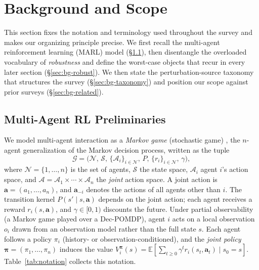 \section{Background and Scope}
\label{sec:background}

This section fixes the notation and terminology used throughout the survey and
makes our organizing principle precise. We first recall the multi-agent
reinforcement learning (MARL) model (\S\ref{sec:bg-marl}), then disentangle the
overloaded vocabulary of \emph{robustness} and define the worst-case objects that
recur in every later section (\S\ref{sec:bg-robust}). We then state the
perturbation-source taxonomy that structures the survey (\S\ref{sec:bg-taxonomy})
and position our scope against prior surveys (\S\ref{sec:bg-related}).

\subsection{Multi-Agent RL Preliminaries}
\label{sec:bg-marl}

We model multi-agent interaction as a \emph{Markov game} (stochastic game)
\cite{littman1994markov}, the $n$-agent generalization of the Markov decision
process, written as the tuple
\[
\mathcal{G} = \bigl(\mathcal{N},\,\mathcal{S},\,\{\mathcal{A}_i\}_{i\in\mathcal{N}},
\,P,\,\{r_i\}_{i\in\mathcal{N}},\,\gamma\bigr),
\]
where $\mathcal{N}=\{1,\dots,n\}$ is the set of agents, $\mathcal{S}$ the state
space, $\mathcal{A}_i$ agent $i$'s action space, and
$\mathcal{A}=\mathcal{A}_1\times\cdots\times\mathcal{A}_n$ the \emph{joint} action
space. A joint action is $\mathbf{a}=(a_1,\dots,a_n)$, and $\mathbf{a}_{-i}$
denotes the actions of all agents other than $i$. The transition kernel
$P(s'\mid s,\mathbf{a})$ depends on the joint action; each agent receives a reward
$r_i(s,\mathbf{a})$, and $\gamma\in[0,1)$ discounts the future. Under partial
observability (a Markov game played over a Dec-POMDP), agent $i$ acts on a local
observation $o_i$ drawn from an observation model rather than the full state $s$.
Each agent follows a policy $\pi_i$ (history- or observation-conditioned), and the
\emph{joint policy} $\boldsymbol{\pi}=(\pi_1,\dots,\pi_n)$ induces the value
$V_i^{\boldsymbol{\pi}}(s)=\mathbb{E}\!\left[\sum_{t\ge0}\gamma^t
r_i(s_t,\mathbf{a}_t)\mid s_0=s\right]$. Table~\ref{tab:notation} collects this
notation.

